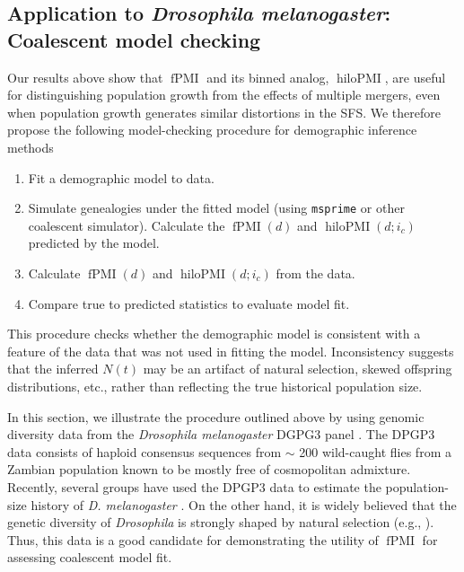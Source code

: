 \documentclass[11pt, letterpaper]{article}   	%
\DeclareMathOperator{\fpmi}{fPMI}
\DeclareMathOperator{\hilopmi}{hiloPMI}
\begin{document}
\subsection*{Application to \textit{Drosophila melanogaster}: Coalescent model checking}

Our results above show that $\fpmi$ and its binned analog, $\hilopmi$, are useful for distinguishing population growth from the effects of multiple mergers, even when population growth generates similar distortions in the SFS.
We therefore propose the following model-checking procedure for demographic inference methods
\begin{enumerate}[label=(\roman*), before=\unskip{: }]
    \item Fit a demographic model to data.
    \item Simulate genealogies under the fitted model (using \texttt{msprime} or other coalescent simulator). Calculate the $\fpmi(d)$ and $\hilopmi(d;i_c)$ predicted by the model.
    \item Calculate $\fpmi(d)$ and $\hilopmi(d;i_c)$ from the data.
    \item Compare true to predicted statistics to evaluate model fit.
\end{enumerate}
This procedure checks whether the demographic model is consistent with a feature of the data that was not used in fitting the model.
Inconsistency suggests that the inferred $N(t)$ may be an artifact of natural selection, skewed offspring distributions, etc., rather than reflecting the true historical population size.

In this section, we illustrate the procedure outlined above by using genomic diversity data from the \textit{Drosophila melanogaster} DGPG3 panel \autocite{LackEtAl2015}.
The DPGP3 data consists of haploid consensus sequences from $\sim$ 200 wild-caught flies from a Zambian population known to be mostly free of cosmopolitan admixture.
Recently, several groups have used the DPGP3 data to estimate the population-size history of \textit{D. melanogaster} \autocite{TerhorstEtAl2017,RagsdaleGutenkunst2017}.
On the other hand, it is widely believed that the genetic diversity of \textit{Drosophila} is strongly shaped by natural selection (e.g., \cite{ElyashivEtAl2016, GarudPetrov2016}).
Thus, this data is a good candidate for demonstrating the utility of $\fpmi$ for assessing coalescent model fit.
\end{document}
